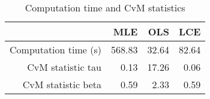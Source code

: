 \begin{table}[ht]
\centering
\begin{tabular}{rrrr}
  \hline
 & MLE & OLS & LCE \\ 
  \hline
Computation time (s) & 568.83 & 32.64 & 82.64 \\ 
  CvM statistic tau & 0.13 & 17.26 & 0.06 \\ 
  CvM statistic beta & 0.59 & 2.33 & 0.59 \\ 
   \hline
\end{tabular}
\caption{Computation time and CvM statistics} 
\label{tab:weibull:time:cvm}
\end{table}
